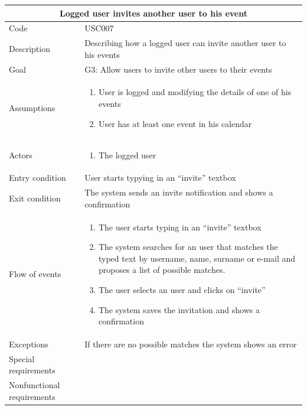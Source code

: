 \documentclass[10pt,a4paper,titlepage]{article}
\begin{document}
\begin{tabular}[h]{| p{3cm} | p{10cm} |}
\hline \multicolumn{2}{|c|}{\textbf{ Logged user invites another user to his event }} \\ 
\hline Code & USC007 \\ 
\hline Description & Describing how a logged user can invite another user to his events \\
\hline Goal & G3: Allow users to invite other users to their events \\
\hline Assumptions  & \begin{enumerate}
\item User is logged and modifying the details of one of his events
\item User has at least one event in his calendar
\end{enumerate} \\
\hline Actors &  \begin{enumerate}
\item The logged user
\end{enumerate} \\
\hline Entry condition & User starts typying in an “invite” textbox \\
\hline Exit condition & The system sends an invite notification  and shows a confirmation\\
\hline Flow of events & \begin{enumerate}
\item The user starts typing in an “invite” textbox
\item The system searches for an user that matches the typed text by username, name, surname or e-mail and proposes a list of possible matches.
\item The user selects an user and clicks on “invite”
\item The system saves the invitation and shows a confirmation
\end{enumerate}\\
\hline Exceptions & If there are no possible matches the system shows an error \\
\hline Special requirements & \\
\hline Nonfunctional requirements & \\
\hline
\end{tabular}
\end{document}
